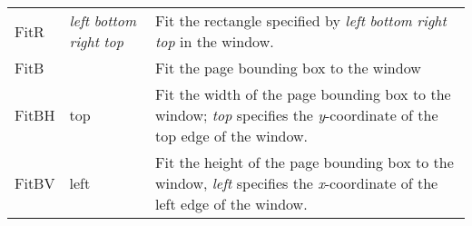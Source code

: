 {\begin{center}
\begin{xtabular}{|p{2cm}|p{4cm}|p{6cm}|}
FitR  & \emph{left} \emph{bottom}    \emph{right} \emph{top}      & Fit the rectangle specified by   \emph{left} \emph{bottom} \emph{right} \emph{top} in the window.                                                                                                                                                                                                                                                             \\
FitB  &                                                           & Fit the page bounding box to the window                                                                                                                                                                                                                                                                                                                       \\
FitBH & top                                                       & Fit the width of the page bounding box    to the window; \emph{top} specifies the    \emph{y}-coordinate of the top edge of the    window.                                                                                                                                                                                                                    \\
FitBV & left                                                      & Fit the height of the page bounding box    to the window, \emph{left} specifies the    \emph{x}-coordinate of the left edge of the    window.                                                                                                                                                                                                                 \\
\bottomrule
\end{xtabular}
\end{center}
} 

